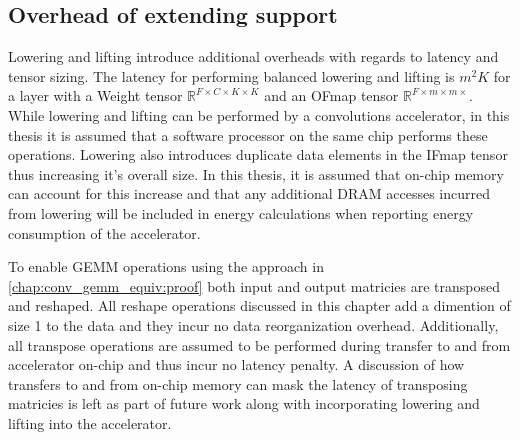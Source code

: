 \subsection{Overhead of extending support}
\label{chap:conv_gemm_equiv:overhead}

Lowering and lifting introduce additional overheads with regards to latency and
tensor sizing. The latency for performing balanced lowering and lifting is
$m^{2}K$ for a layer with a Weight tensor $\mathbb{R}^{F\times C\times K\times
K}$ and an OFmap tensor $\mathbb{R}^{F\times m\times m\times}$. While lowering
and lifting can be performed by a convolutions accelerator, in this thesis it is
assumed that a software processor on the same chip performs these operations.
Lowering also introduces duplicate data elements in the IFmap tensor thus
increasing it's overall size. In this thesis, it is assumed that on-chip memory
can account for this increase and that any additional DRAM accesses incurred
from lowering will be included in energy calculations when reporting energy
consumption of the accelerator.

To enable GEMM operations using the approach in
\autoref{chap:conv_gemm_equiv:proof} both input and output matricies are
transposed and reshaped. All reshape operations discussed in this chapter add a
dimention of size 1 to the data and they incur no data reorganization overhead.
Additionally, all transpose operations are assumed to be performed during
transfer to and from accelerator on-chip and thus incur no latency penalty. A
discussion of how transfers to and from on-chip memory can mask the latency of
transposing matricies is left as part of future work along with incorporating
lowering and lifting into the accelerator. 
